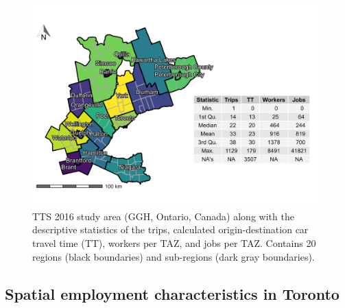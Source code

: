 \documentclass[10pt,letterpaper]{article}
\begin{document}
\begin{figure}

{\centering \includegraphics[width=1\linewidth]{images/TTS16-survey-area} 

}

\caption{\label{fig:TTS-16-survey-area}TTS 2016 study area (GGH, Ontario, Canada) along with the descriptive statistics of the trips, calculated origin-destination car travel time (TT), workers per TAZ, and jobs per TAZ. Contains 20 regions (black boundaries) and sub-regions (dark gray boundaries).}\label{fig:TTS-16-survey-area}
\end{figure}

\hypertarget{spatial-employment-characteristics-in-toronto}{%
\subsection{Spatial employment characteristics in
Toronto}\label{spatial-employment-characteristics-in-toronto}}
\end{document}
